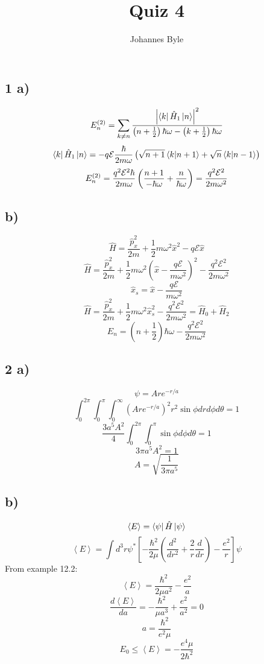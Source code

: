 \documentclass[english]{article}
\begin{document}
\author{Johannes Byle}
\title{Quiz 4}
\maketitle
\subsection*{1 a)}
$$E^{(2)}_n=\sum_{k\neq n}\frac{\left|\bra{k}\hat{H}_1\ket{n}\right|^2}{\left(n+\frac{1}{2}\right)\hbar\omega-\left(k+\frac{1}{2}\right)\hbar\omega}$$
$$\bra{k}\hat{H}_1\ket{n}=-q\vb{\mathcal{E}}\frac{\hbar}{2m\omega}\left(\sqrt{n+1}\bra{k}\ket{n+1}+\sqrt{n}\bra{k}\ket{n-1}\right)$$
$$E^{(2)}_n=\frac{q^2\vb{\mathcal{E}}^2\hbar}{2m\omega}\left(\frac{n+1}{-\hbar\omega}+\frac{n}{\hbar\omega}\right)=\frac{q^2\vb{\mathcal{E}}^2}{2m\omega^2}$$
\subsection*{b)}
$$\hat{H}=\frac{\hat{p}_x^2}{2m}+\frac{1}{2}m\omega^2\hat{x}^2-q\mathcal{E}\hat{x}$$
$$\hat{H}=\frac{\hat{p}_x^2}{2m}+\frac{1}{2}m\omega^2\left(\hat{x}-\frac{q\mathcal{E}}{m\omega^2}\right)^2-\frac{q^2\mathcal{E}^2}{2m\omega^2}$$
$$\hat{x}_s=\hat{x}-\frac{q\mathcal{E}}{m\omega^2}$$
$$\hat{H}=\frac{\hat{p}_x^2}{2m}+\frac{1}{2}m\omega^2\hat{x}_s^2-\frac{q^2\mathcal{E}^2}{2m\omega^2}=\hat{H}_0+\hat{H}_2$$
$$E_n=\left(n+\frac{1}{2}\right)\hbar\omega-\frac{q^2\mathcal{E}^2}{2m\omega^2}$$
\subsection*{2 a)}
$$\psi=Are^{-r/a}$$
$$\int_0^{2\pi}\int_0^{\pi}\int_0^{\infty}\left(Are^{-r/a}\right)^2r^2\sin\phi drd\phi d\theta=1$$
$$\frac{3a^5A^2}{4}\int_0^{2\pi}\int_0^{\pi}\sin\phi d\phi d\theta=1$$
$$3\pi a^5A^2=1$$
$$A=\sqrt{\frac{1}{3\pi a^5}}$$
\subsection*{b)}
$$\left\langle E\right\rangle=\bra{\psi}\hat{H}\ket{\psi}$$
$$\left\langle E\right\rangle=\int d^3r\psi^*\left[-\frac{\hbar^2}{2\mu}\left(\frac{d^2}{dr^2}+\frac{2}{r}\frac{d}{dr}\right)-\frac{e^2}{r}\right]\psi$$
From example 12.2:
$$\left\langle E\right\rangle=\frac{\hbar^2}{2\mu a^2}-\frac{e^2}{a}$$
$$\frac{d\left\langle E\right\rangle}{da}=-\frac{\hbar^2}{\mu a^3}+\frac{e^2}{a^2}=0$$
$$a=\frac{\hbar^2}{e^2\mu}$$
$$E_0\leq\left\langle E\right\rangle=-\frac{e^4\mu}{2\hbar^2}$$
\end{document}
